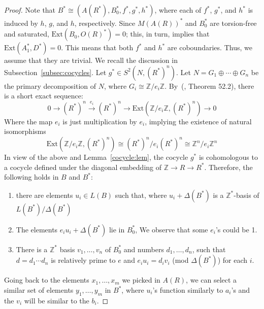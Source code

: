 \documentclass{article}
\theoremstyle{remark}
\def\Z{{\mathbb{Z}}}
\def\Ext{\text{Ext}}
\begin{document}
\begin{proof}
Note that $B^*\cong (A(R^*),B_0^*,f^*,g^*,h^*)$, where each of $f^*$, $g^*$, and $h^*$ is induced by $h$, $g$, and $h$, respectively. Since $M(A(R))^*$ and $B_0^*$ are torsion-free and saturated, $\Ext(B_0,O(R)^*)=0$; this, in turn, implies that $\Ext(A_1^*,D^*)=0$. This means that both $f^*$ and $h^*$ are coboundaries. Thus, we assume that they are trivial. We recall the discussion in Subsection~\ref{subsec:cocycles}. Let $g^*\in S^2(N, (R^*)^n)$. Let $N=G_1\oplus\cdots \oplus G_n$ be the primary decomposition of $N$, where $G_i\cong \Z/e_i\Z$. By~(\cite{fuchs}, Theorem 52.2), there is a short exact sequence:
$$0\to(R^*)^n\xrightarrow{e_i} (R^*)^n \to \Ext(\Z/e_i\Z,(R^*)^n)\to 0$$
Where the map $e_i$ is just multiplication by $e_i$, implying the existence of natural isomorphisms
$$\Ext(\Z/e_i\Z, (R^*)^n)\cong (R^*)^n/e_i(R^*)^n\cong \Z^n/e_i\Z^n$$
In view of the above and Lemma~\ref{cocycle:lem}, the cocycle $g^*$ is cohomologous to a cocycle defined under the diagonal embedding of $\Z\to R\to R^*$. Therefore, the following holds in $B$ and $B^*$:
\begin{enumerate}
    \item there are elements $u_i \in L(B)$ such that, where $u_i+\Delta(B^*)$ is a $\Z^*$-basis of $L(B^*)/\Delta(B^*)$
    \item The elements $e_iu_i+\Delta(B^*)$ lie in $B_0^*$, We observe that some $e_i$'s could be 1.
    \item There is a $\Z^*$ basis $v_1, \ldots,  v_n$ of $B_0^*$ and numbers $d_1, \ldots, d_n$, such that $d=d_1\cdots d_n$ is relatively prime to $e$ and $e_iu_i=d_iv_i$ (mod $\Delta(B^*)$) for each $i$.
    \end{enumerate}
Going back to the elements $x_1, \ldots, x_m$ we picked in $A(R)$, we can select a similar set of elements $y_1,\ldots , y_m$ in $B^*$, where $u_i$'s function similarly to $a_i$'s and the $v_i$ will be similar to the $b_i$.  
    

\end{proof}
\end{document}
